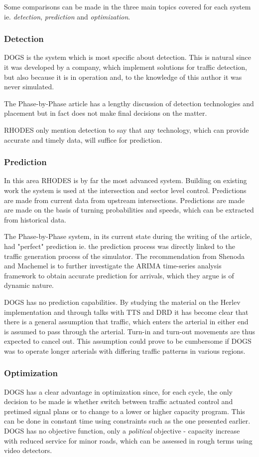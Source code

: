 Some comparisons can be made in the three main topics covered for each system ie. \textit{detection}, \textit{prediction} and \textit{optimization}.

\subsubsection*{Detection}
DOGS is the system which is most specific about detection. This is natural since it was developed by a company, which implement solutions for traffic detection, but also because it is in operation and, to the knowledge of this author it was never simulated.

The Phase-by-Phase article has a lengthy discussion of detection technologies and placement but in fact does not make final decisions on the matter.

RHODES only mention detection to say that any technology, which can provide accurate and timely data, will suffice for prediction.

\subsubsection*{Prediction}
In this area RHODES is by far the most advanced system. Building on existing work the system is used at the intersection and sector level control. Predictions are made from current data from upstream intersections. Predictions are made are made on the basis of turning probabilities and speeds, which can be extracted from historical data.

The Phase-by-Phase system, in its current state during the writing of the article, had "perfect" prediction ie. the prediction process was directly linked to the traffic generation process of the simulator. The recommendation from Shenoda and Machemel is to further investigate the ARIMA time-series analysis framework to obtain accurate prediction for arrivals, which they argue is of dynamic nature.

DOGS has no prediction capabilities. By studying the material on the Herlev implementation and through talks with TTS and DRD it has become clear that there is a general assumption that traffic, which enters the arterial in either end is assumed to pass through the arterial. Turn-in and turn-out movements are thus expected to cancel out. This assumption could prove to be cumbersome if DOGS was to operate longer arterials with differing traffic patterns in various regions.

\subsubsection*{Optimization}
DOGS has a clear advantage in optimization since, for each cycle, the only decision to be made is whether switch between traffic actuated control and pretimed signal plans or to change to a lower or higher capacity program. This can be done in constant time using constraints such as the one presented earlier. DOGS has no objective function, only a \textit{political} objective - capacity increase with reduced service for minor roads, which can be assessed in rough terms using video detectors.

